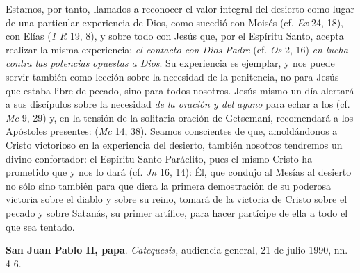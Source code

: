\begin{patercite}Estamos, por tanto, llamados a reconocer el valor integral del desierto como lugar de una particular experiencia de Dios, como sucedió con Moisés (cf. \textit{Ex} 24, 18), con Elías (\textit{1 R} 19, 8), y sobre todo con Jesús que,  por el Espíritu Santo, acepta realizar la misma experiencia: \textit{el contacto con Dios Padre} (cf. \textit{Os} 2, 16) \textit{en lucha contra las potencias} \textit{opuestas a Dios}. Su experiencia es ejemplar, y nos puede servir también como lección sobre la necesidad de la penitencia, no para Jesús que estaba libre de pecado, sino para todos nosotros. Jesús mismo un día alertará a sus discípulos sobre la necesidad \textit{de la oración y del ayuno} para echar a los  (cf. \textit{Mc} 9, 29) y, en la tensión de la solitaria oración de Getsemaní, recomendará a los Apóstoles presentes:  (\textit{Mc} 14, 38). Seamos conscientes de que, amoldándonos a Cristo victorioso en la experiencia del desierto, también nosotros tendremos un divino confortador: el Espíritu Santo Paráclito, pues el mismo Cristo ha prometido que  y nos lo dará (cf. \textit{Jn} 16, 14): Él, que condujo al Mesías al desierto no sólo  sino también para que diera la primera demostración de su poderosa victoria sobre el diablo y sobre su reino, tomará de la victoria de Cristo sobre el pecado y sobre Satanás, su primer artífice, para hacer partícipe de ella a todo el que sea tentado.\end{patercite}

\begin{patercite}\textbf{San Juan Pablo II, papa}. \textit{Catequesis,} audiencia general, 21 de julio 1990, nn. 4-6.\end{patercite}

